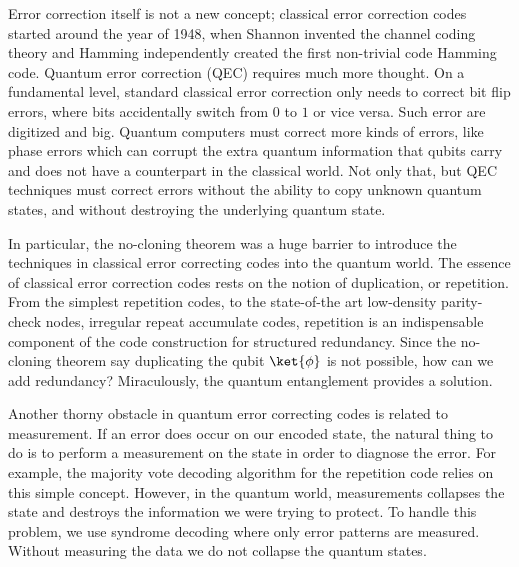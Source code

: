 Error correction itself is not a new concept; classical error correction codes started around the year of 1948, when Shannon invented the channel coding theory and Hamming independently created the first non-trivial code Hamming code. Quantum error correction (QEC) requires much more thought. On a fundamental level, standard classical error correction only needs to correct bit flip errors, where bits accidentally switch from \(0\) to \(1\) or vice versa. Such error are digitized and big. Quantum computers must correct more kinds of errors, like phase errors which can corrupt the extra quantum information that qubits carry and does not have a counterpart in the classical world. Not only that, but QEC techniques must correct errors without the ability to copy unknown quantum states, and without destroying the underlying quantum state.

In particular, the no-cloning theorem was a huge barrier to introduce the techniques in classical error correcting codes into the quantum world. The essence of classical error correction codes rests on the notion of duplication, or repetition. From the simplest repetition codes, to the state-of-the art low-density parity-check nodes, irregular repeat accumulate codes, repetition is an indispensable component of the code construction for structured redundancy. Since the no-cloning theorem say duplicating the qubit \(\ket{\phi}\) is not possible, how can we add redundancy? Miraculously, the quantum entanglement provides a solution.
 
 Another thorny obstacle in quantum error correcting codes is related to measurement.   If an error does occur on our encoded state, the natural thing to do is to perform a measurement on the state in order to diagnose the error. For example, the majority vote decoding algorithm for the repetition code relies on this simple concept. However, in the quantum world, measurements collapses the state and destroys the information we were trying to protect. To handle this problem, we use syndrome decoding where only error patterns are measured. Without measuring the data we do not collapse the quantum states. 

